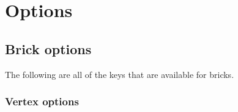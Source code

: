 \documentclass{ltxdoc}
\begin{document}
\begin{center}
\end{center}

\section{Options}

\subsection{Brick options} \label{sec: brick/options}

The following are all of the keys that are available for bricks.

\subsubsection{Vertex options}
\end{document}
